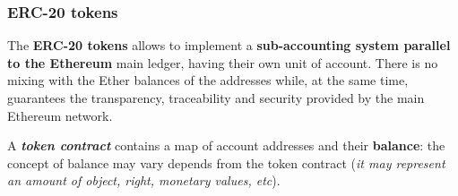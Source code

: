 \documentclass[10pt,a4paper]{report}
\begin{document}
\subsubsection{ERC-20 tokens}\label{sec:erc-20-tokens}
The \textbf{ERC-20 tokens} allows to implement a \textbf{sub-accounting system parallel to the Ethereum} main ledger, having their own unit of account.  There is no mixing with the Ether balances of the addresses while, at the same time, guarantees the transparency, traceability and security provided by the main Ethereum network.

A \textit{\textbf{token contract}} contains a map of account addresses and their \textbf{balance}: the concept of balance may vary depends from the token contract (\textit{it may represent an amount of object, right, monetary values, etc}).
\end{document}
